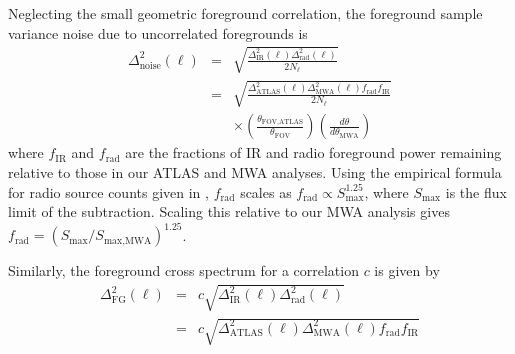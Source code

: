 \documentclass[numberedappendix]{emulateapj}
\newcommand{\rad}{\text{rad}}
\newcommand{\IR}{\text{IR}}
\newcommand{\ir}{\text{IR}}
\newcommand{\fov}{\text{FOV}}
\begin{document}
Neglecting the small geometric foreground correlation, the foreground sample variance noise due to uncorrelated foregrounds is
\begin{eqnarray}
\Delta^2_\text{noise}(\ell) &=& \sqrt{\frac{\Delta^2_\IR(\ell) \Delta^2_\rad(\ell)}{2N_\ell}} \nonumber \\
&=&\sqrt{\frac{\Delta^2_{\text{ATLAS}}(\ell) \Delta^2_{\text{MWA}}(\ell)f_\rad f_\ir}{2N_\ell}} \nonumber \\
&&\times \left( \frac{\theta_{\fov,\text{ATLAS}}}{\theta_\fov}\right)\left(\frac{d\theta}{d\theta_{\text{MWA}}}\right)
\end{eqnarray}
where $f_\ir$ and $f_\rad$ are the fractions of IR and radio foreground power remaining relative to those in our ATLAS and MWA analyses. Using the empirical formula for radio source counts given in \citet{dimatteo02}, $f_\rad$ scales as $f_\rad\propto S_\text{max}^{1.25}$, where $S_\text{max}$ is the flux limit of the subtraction. Scaling this relative to our MWA analysis gives $f_\rad=(S_\text{max}/S_{\text{max},\text{MWA}})^{1.25}$.

Similarly, the foreground cross spectrum for a correlation $c$ is given by
\begin{eqnarray}
\Delta^2_\text{FG}(\ell)& =&c\sqrt{\Delta^2_\IR(\ell) \Delta^2_\rad(\ell)} \nonumber \\
&=&c\sqrt{\Delta^2_{\text{ATLAS}}(\ell) \Delta^2_{\text{MWA}}(\ell)f_\rad f_\ir }
\end{eqnarray}
\end{document}
